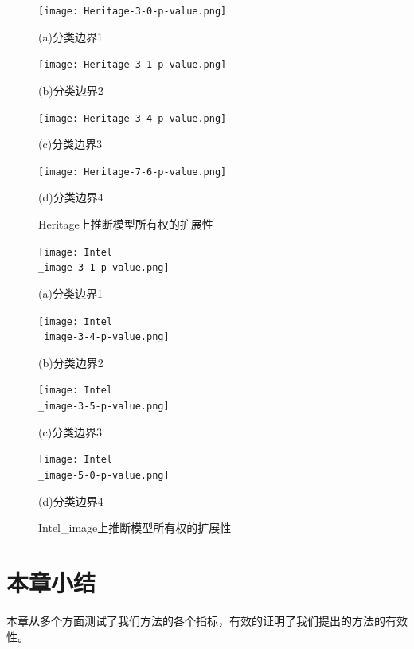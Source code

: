 \begin{figure}[htbp]%
	\centering
	\begin{minipage}[htbp]{0.49\linewidth}        %
		\hspace{2mm}
		\centering
		\texttt{[image: Heritage-3-0-p-value.png]}
		\centerline{(a)分类边界1}
	\end{minipage}
	\begin{minipage}[htbp]{0.49\linewidth}        %
		\hspace{2mm}
		\centering
		\texttt{[image: Heritage-3-1-p-value.png]}
		\centerline{(b)分类边界2}
	\end{minipage}
	\begin{minipage}[htbp]{0.49\linewidth}        %
		\hspace{2mm}
		\centering
		\texttt{[image: Heritage-3-4-p-value.png]}
		\centerline{(c)分类边界3}
	\end{minipage}
	\begin{minipage}[htbp]{0.49\linewidth}        %
		\hspace{2mm}
		\centering
		\texttt{[image: Heritage-7-6-p-value.png]}
		\centerline{(d)分类边界4}
	\end{minipage}
\setlength{\abovecaptionskip}{7mm} %
\caption{Heritage上推断模型所有权的扩展性}
\label{Heritage上推断模型所有权的扩展性}
\end {figure}
		
\begin{figure}[htbp]%
	\centering
	\begin{minipage}[htbp]{0.49\linewidth}        %
		\hspace{2mm}
		\centering
		\texttt{[image: Intel\\\_image-3-1-p-value.png]}
		\centerline{(a)分类边界1}
	\end{minipage}
	\begin{minipage}[htbp]{0.49\linewidth}        %
		\hspace{2mm}
		\centering
		\texttt{[image: Intel\\\_image-3-4-p-value.png]}
		\centerline{(b)分类边界2}
	\end{minipage}
	\begin{minipage}[htbp]{0.49\linewidth}        %
		\hspace{2mm}
		\centering
		\texttt{[image: Intel\\\_image-3-5-p-value.png]}
		\centerline{(c)分类边界3}
	\end{minipage}
	\begin{minipage}[htbp]{0.49\linewidth}        %
		\hspace{2mm}
		\centering
		\texttt{[image: Intel\\\_image-5-0-p-value.png]}
		\centerline{(d)分类边界4}
	\end{minipage}
\setlength{\abovecaptionskip}{7mm} %
\caption{Intel\_image上推断模型所有权的扩展性}
\label{Intel-image上推断模型所有权的扩展性}
\end {figure}

\section{本章小结}

本章从多个方面测试了我们方法的各个指标，有效的证明了我们提出的方法的有效性。


